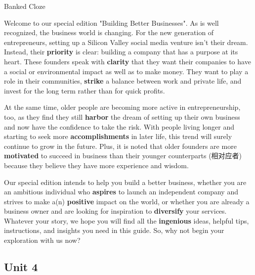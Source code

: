 \begin{question}{Banked Cloze}

Welcome to our special edition "Building Better Businesses". As is well recognized, the business world is changing. For the new generation of entrepreneurs, setting up a Silicon Valley social media venture isn't their dream. Instead, their \textbf{\color{red}priority} is clear: building a company that has a purpose at its heart. These founders speak with \textbf{\color{red}clarity} that they want their companies to have a social or environmental impact as well as to make money. They want to play a role in their communities, \textbf{\color{red}strike} a balance between work and private life, and invest for the long term rather than for quick profits.

At the same time, older people are becoming more active in entrepreneurship, too, as they find they still \textbf{\color{red}harbor} the dream of setting up their own business and now have the confidence to take the risk. With people living longer and starting to seek more \textbf{\color{red}accomplishments} in later life, this trend will surely continue to grow in the future. Plus, it is noted that older founders are more \textbf{\color{red}motivated} to succeed in business than their younger counterparts (相对应者) because they believe they have more experience and wisdom.

Our special edition intends to help you build a better business, whether you are an ambitious individual who \textbf{\color{red}aspires} to launch an independent company and strives to make a(n) \textbf{\color{red}positive} impact on the world, or whether you are already a business owner and are looking for inspiration to \textbf{\color{red}diversify} your services. Whatever your story, we hope you will find all the \textbf{\color{red}ingenious} ideas, helpful tips, instructions, and insights you need in this guide. So, why not begin your exploration with us now?
	
\end{question}

\newpage

\subsection{Unit 4}

